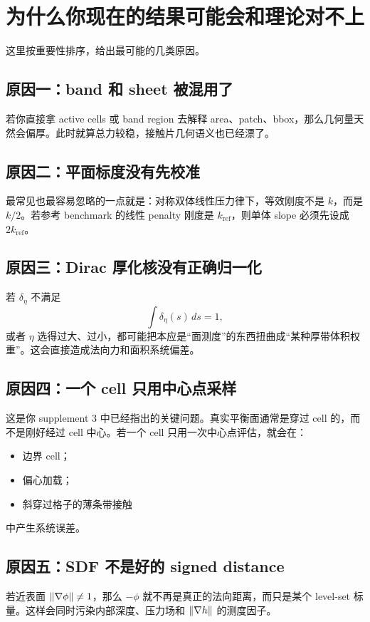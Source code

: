 \documentclass[12pt,a4paper]{ctexart}
\begin{document}
\section{为什么你现在的结果可能会和理论对不上}

这里按重要性排序，给出最可能的几类原因。

\subsection{原因一：band 和 sheet 被混用了}
若你直接拿 active cells 或 band region 去解释 area、patch、bbox，那么几何量天然会偏厚。此时就算总力较稳，接触片几何语义也已经漂了。

\subsection{原因二：平面标度没有先校准}
最常见也最容易忽略的一点就是：对称双体线性压力律下，等效刚度不是 $k$，而是 $k/2$。若参考 benchmark 的线性 penalty 刚度是 $k_{\mathrm{ref}}$，则单体 slope 必须先设成 $2k_{\mathrm{ref}}$。

\subsection{原因三：Dirac 厚化核没有正确归一化}
若 $\delta_\eta$ 不满足
\begin{equation}
    \int \delta_\eta(s)\,ds = 1,
\end{equation}
或者 $\eta$ 选得过大、过小，都可能把本应是“面测度”的东西扭曲成“某种厚带体积权重”。这会直接造成法向力和面积系统偏差。

\subsection{原因四：一个 cell 只用中心点采样}
这是你 supplement 3 中已经指出的关键问题。真实平衡面通常是穿过 cell 的，而不是刚好经过 cell 中心。若一个 cell 只用一次中心点评估，就会在：
\begin{itemize}
    \item 边界 cell；
    \item 偏心加载；
    \item 斜穿过格子的薄条带接触
\end{itemize}
中产生系统误差。

\subsection{原因五：SDF 不是好的 signed distance}
若近表面 $\norm{\nabla \phi}\neq 1$，那么 $-\phi$ 就不再是真正的法向距离，而只是某个 level-set 标量。这样会同时污染内部深度、压力场和 $\norm{\nabla h}$ 的测度因子。
\end{document}
